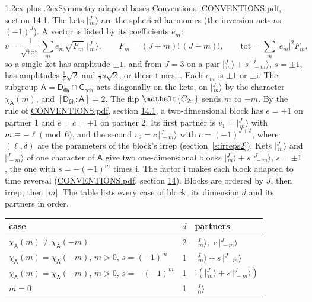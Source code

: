 \documentclass[10pt,a4paper]{article}
\makeatletter
\renewcommand\section{\@startsection{section}{1}{\z@}{-3ex plus -1ex minus -.2ex}%
  {1.2ex plus .2ex}{\normalfont\large\sffamily\bfseries\color{parttitle}}}
\numberwithin{equation}{section}
\newcommand{\eltfont}[1]{{\let\sigma\eltsigma\mathelt{#1}}}
\newcommand{\grp}[1]{\mathsf{#1}}
\newcommand{\elt}[1]{\eltfont{#1}}
\newcommand{\grpindex}[2]{[#1 : #2]}
\newcommand{\iunit}{\mathrm{i}}
\newcommand{\chiA}{\chi_{\grp{A}}}
\newcommand{\jm}[2]{\bigl\lvert{}^{#1}_{\,#2}\bigr\rangle}
\makeatother
\begin{document}
\section{Symmetry-adapted bases}\label{s:bases}
Conventions: \href{../../CONVENTIONS.pdf}{CONVENTIONS.pdf}, section \href{../../CONVENTIONS.pdf\#conv.14.1}{14.1}.
\leavevmode\label{n:index.m}\label{n:vector.ket}The kets $\jm{J}{m}$ are the spherical harmonics (the inversion acts as $(-1)^J$). \label{n:index.ketcoefficient}\label{n:vector.basis.symmetry}\label{n:index.ketweight}\label{n:index.total}A vector is listed by its coefficients $e_m$:
\begin{equation}\label{e:ket}v = \frac{1}{\sqrt{\mathrm{tot}}}\sum_m e_m\sqrt{F_m}\;\jm{J}{m},\qquad F_m = (J+m)!\,(J-m)!,\qquad \mathrm{tot} = \sum_m |e_m|^2F_m,\end{equation}
\leavevmode\label{n:index.pair.sign}so a single ket has amplitude $\pm1$, and from $J = 3$ on a pair $\jm{J}{m} + s\,\jm{J}{-m}$, $s = \pm1$, has amplitudes $\tfrac{1}{2}\sqrt{2}$ and $\tfrac{1}{2}s\sqrt{2}$, or these times $\iunit$. Each $e_m$ is $\pm1$ or $\pm\iunit$.
\leavevmode\label{n:group.A}\label{n:function.character.abelian}The subgroup $\grp{A} = \grp{D_{6h}}\cap\grp{C_{\infty h}}$ acts diagonally on the kets, on $\jm{J}{m}$ by the character $\chiA(m)$, and $\grpindex{\grp{D_{6h}}}{\grp{A}} = 2$. The flip $\elt{C_{2x}}$ sends $m$ to $-m$. \label{n:index.partner.sign}By the rule of \href{../../CONVENTIONS.pdf}{CONVENTIONS.pdf}, section \href{../../CONVENTIONS.pdf\#conv.14.1}{14.1}, a two-dimensional block has $e = +1$ on partner 1 and $e = c = \pm1$ on partner 2. Its first partner is $v_1 = \jm{J}{m}$ with $m \equiv -\ell \pmod{6}$, and the second $v_2 = c\,\jm{J}{-m}$ with $c = (-1)^{J+\delta}$, where $(\ell, \delta)$ are the parameters of the block's irrep (section~\ref{s:irreps2}). Kets $\jm{J}{m}$ and $\jm{J}{-m}$ of one character of $\grp{A}$ give two one-dimensional blocks $\jm{J}{m} + s\,\jm{J}{-m}$, $s = \pm1$, the one with $s = -(-1)^m$ times $\iunit$. The factor $\iunit$ makes each block adapted to time reversal (\href{../../CONVENTIONS.pdf}{CONVENTIONS.pdf}, section \href{../../CONVENTIONS.pdf\#conv.14}{14}). Blocks are ordered by $J$, then irrep, then $|m|$.
\leavevmode\label{n:head.case}\label{n:head.partners}The table lists every case of block, its dimension $d$ and its partners in order.
\begin{center}\begin{tabular}{@{}lrl@{}}\toprule
case & $d$ & partners\\\midrule
$\chiA(m) \ne \chiA(-m)$ & 2 & $\jm{J}{m}$;\ $c\,\jm{J}{-m}$\\
$\chiA(m) = \chiA(-m)$, $m > 0$, $s = (-1)^m$ & 1 & $\jm{J}{m} + s\,\jm{J}{-m}$\\
$\chiA(m) = \chiA(-m)$, $m > 0$, $s = -(-1)^m$ & 1 & $\iunit(\jm{J}{m} + s\,\jm{J}{-m})$\\
$m = 0$ & 1 & $\jm{J}{0}$\\
\bottomrule\end{tabular}\end{center}
\end{document}
